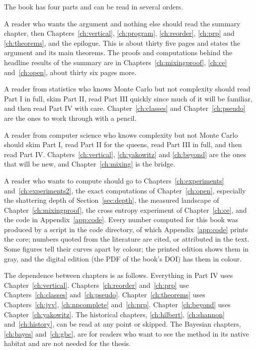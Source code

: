 \documentclass[11pt,twoside,openany]{book}
\theoremstyle{plain}
\theoremstyle{definition}
\theoremstyle{remark}
\begin{document}
The book has four parts and can be read in several orders.

A reader who wants the argument and nothing else should read the summary chapter, then Chapters~\ref{ch:vertical}, \ref{ch:program}, \ref{ch:reorder}, \ref{ch:prp} and \ref{ch:theorems}, and the epilogue. This is about thirty five pages and states the argument and its main theorems. The proofs and computations behind the headline results of the summary are in Chapters~\ref{ch:mixingproof}, \ref{ch:ce} and~\ref{ch:open}, about thirty six pages more.

A reader from statistics who knows Monte Carlo but not complexity should read Part I in full, skim Part II, read Part III quickly since much of it will be familiar, and then read Part IV with care. Chapter~\ref{ch:classes} and Chapter~\ref{ch:pseudo} are the ones to work through with a pencil.

A reader from computer science who knows complexity but not Monte Carlo should skim Part I, read Part II for the queens, read Part III in full, and then read Part IV. Chapters~\ref{ch:vertical}, \ref{ch:yakowitz} and \ref{ch:beyond} are the ones that will be new, and Chapter~\ref{ch:mixing} is the bridge.

A reader who wants to compute should go to Chapters~\ref{ch:experiments} and~\ref{ch:experiments2}, the exact computations of Chapter~\ref{ch:open}, especially the shattering depth of Section~\ref{sec:depth}, the measured landscape of Chapter~\ref{ch:mixingproof}, the cross entropy experiment of Chapter~\ref{ch:ce}, and the code in Appendix~\ref{app:code}. Every number computed for this book was produced by a script in the code directory, of which Appendix~\ref{app:code} prints the core; numbers quoted from the literature are cited, or attributed in the text. Some figures tell their curves apart by colour; the printed edition shows them in gray, and the digital edition (the PDF of the book's DOI) has them in colour.

The dependence between chapters is as follows. Everything in Part IV uses Chapter~\ref{ch:vertical}. Chapters~\ref{ch:reorder} and~\ref{ch:prp} use Chapters~\ref{ch:classes} and~\ref{ch:pseudo}. Chapter~\ref{ch:theorems} uses Chapters~\ref{ch:jvv}, \ref{ch:npcomplete} and~\ref{ch:prp}. Chapter~\ref{ch:beyond} uses Chapter~\ref{ch:yakowitz}. The historical chapters, \ref{ch:hilbert}, \ref{ch:shannon} and~\ref{ch:history}, can be read at any point or skipped. The Bayesian chapters, \ref{ch:bayes} and~\ref{ch:gbc}, are for readers who want to see the method in its native habitat and are not needed for the thesis.
\end{document}
